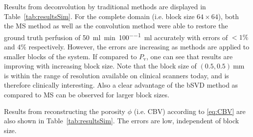 \documentclass[journal,twocolumn]{IEEEtran}
\newcommand{\Perfv}{P_{\mathrm{v}}}
\newcommand{\siPml}{\milli\litre\per\minute\per100\milli\litre}
\begin{document}
	Results from deconvolution by traditional methods are displayed in Table~\ref{tab:resultsSim}. 
	For the complete domain (i.e. block size $64 \times 64$), both the MS method as well as the convolution method were able to restore the ground truth perfusion of \SI{50}{\siPml} accurately with errors of $<1\%$ and $4\%$ respectively.
	However, the errors are increasing as methods are applied to smaller blocks of the system.
	If compared to $\Perfv$, one can see that results are improving with increasing block size. 
	Note that the block size of $(0.5,0.5)\SI{}{\milli\meter}$ is within the range of resolution available on clinical scanners today, and is therefore clinically interesting.
	Also a clear advantage of the bSVD method as compared to MS can be observed for larger block sizes.
		
	Results from reconstructing the porosity $\phi$ (i.e. CBV) according to \eqref{eq:CBV} are also shown in Table~\ref{tab:resultsSim}. The errors are low, independent of block size.
	
\end{document}
